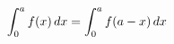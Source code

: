 \documentclass[preview]{standalone}
\begin{document}
\begin{align*}
\special{dvisvgm:raw <g id='unique000'>}\int_0^a f(x)\,dx = \int_0^a f(a-x)\,dx\special{dvisvgm:raw </g>}
\end{align*}
\end{document}
